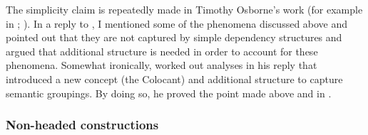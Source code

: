 The\label{page-simplicity-dg} simplicity claim is repeatedly made in Timothy Osborne's work (for example in \citealp[]{OG2016a-u}; \citealp[]{Osborne2018a}). In a reply to \citet{Osborne2018a}, I mentioned
some of the phenomena discussed above and pointed out that they are not captured by simple dependency structures \citep{MuellerEvaluating} and argued
that additional structure is needed in order to account for these phenomena. Somewhat ironically,
\citet{Osborne2019a} worked out analyses in his reply that introduced a new concept (the Colocant)
and additional structure to capture semantic groupings. By doing so, he proved the point made above
and in .


\subsubsection{Non-headed constructions}
\label{sec-headless-constructions-dg}

